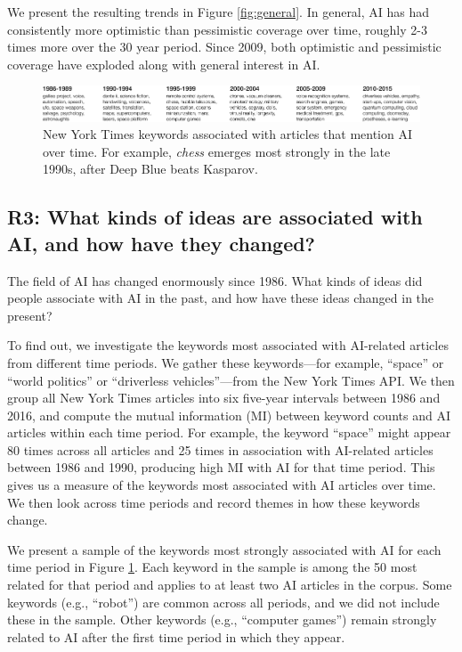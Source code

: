 \documentclass[letterpaper]{article}
\begin{document}
We present the resulting trends in Figure \ref{fig:general}. In general, AI has had consistently more optimistic than pessimistic coverage over time, roughly 2-3 times more over the 30 year period. Since 2009, both optimistic and pessimistic coverage have exploded along with general interest in AI.

\begin{figure}[!t]
\centering
\includegraphics[width=2.0\columnwidth]{topics-over-time}
\caption{New York Times keywords associated with articles that mention AI over time. For example, \textit{chess} emerges most strongly in the late 1990s, after Deep Blue beats Kasparov.}
\label{fig:keywords}
\end{figure}

\subsection{R3: What kinds of ideas are associated with AI, and how have they changed?}

The field of AI has changed enormously since 1986. What kinds of ideas did people associate with AI in the past, and how have these ideas changed in the present? 

To find out, we investigate the keywords most associated with AI-related articles from different time periods. We gather these keywords---for example, ``space'' or ``world politics'' or ``driverless vehicles''---from the New York Times API. We then group all New York Times articles into six five-year intervals between 1986 and 2016, and compute the mutual information (MI) between keyword counts and AI articles within each time period. For example, the keyword ``space'' might appear 80 times across all articles and 25 times in association with AI-related articles between 1986 and 1990, producing high MI with AI for that time period. This gives us a measure of the keywords most associated with AI articles over time. We then look across time periods and record themes in how these keywords change.

We present a sample of the keywords most strongly associated with AI for each time period in Figure \ref{fig:keywords}. Each keyword in the sample is among the 50 most related for that period and applies to at least two AI articles in the corpus. Some keywords (e.g., ``robot'') are common across all periods, and we did not include these in the sample. Other keywords (e.g., ``computer games'') remain strongly related to AI after the first time period in which they appear. 
\end{document}
